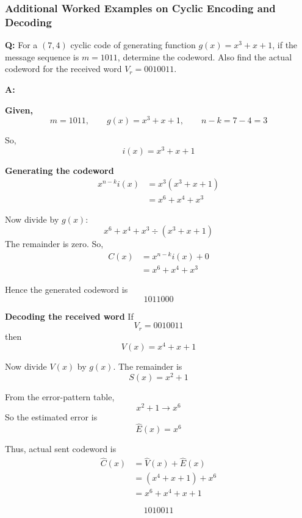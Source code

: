 \documentclass[11pt,a4paper]{book}
\newcounter{qna}[chapter]
\renewcommand{\theqna}{\thechapter.\arabic{qna}}
\newenvironment{questionanswerbox}[1][Example]{%
    \refstepcounter{qna}
    \begin{tcolorbox}[
        enhanced,
        breakable,
        colback=softlavender!10,
        colframe=softlavender!200,
        title={#1~\theqna},
        fonttitle=\bfseries,
        coltitle=white,
        colbacktitle=softlavender!200,
        sharp corners,
        boxrule=1pt,
        left=8pt,
        right=8pt,
        top=6pt,
        bottom=6pt
    ]
}{\end{tcolorbox}}
\begin{document}
\subsubsection{Additional Worked Examples on Cyclic Encoding and Decoding}

\begin{questionanswerbox}[Cyclic Encoding and Decoding Example]
\textbf{Q:} For a \((7,4)\) cyclic code of generating function \(g(x)=x^3+x+1\), if the message sequence is \(m=1011\), determine the codeword. Also find the actual codeword for the received word \(V_r=0010011\).

\textbf{A:}

\textbf{Given,}
\[
m=1011,\qquad g(x)=x^3+x+1,\qquad n-k=7-4=3
\]

So,
\[
i(x)=x^3+x+1
\]

\textbf{Generating the codeword}
\begin{align*}
x^{n-k}i(x)&=x^3(x^3+x+1)\\
          &=x^6+x^4+x^3
\end{align*}

Now divide by \(g(x)\):
\[
x^6+x^4+x^3 \div (x^3+x+1)
\]
The remainder is zero. So,
\begin{align*}
C(x)&=x^{n-k}i(x)+0\\
    &=x^6+x^4+x^3
\end{align*}

Hence the generated codeword is
\[
1011000
\]

\textbf{Decoding the received word}
If
\[
V_r=0010011
\]
then
\[
V(x)=x^4+x+1
\]

Now divide \(V(x)\) by \(g(x)\). The remainder is
\[
S(x)=x^2+1
\]

From the error-pattern table,
\[
x^2+1 \longrightarrow x^6
\]
So the estimated error is
\[
\hat E(x)=x^6
\]

Thus, actual sent codeword is
\begin{align*}
\hat C(x)&=\hat V(x)+\hat E(x)\\
         &=(x^4+x+1)+x^6\\
         &=x^6+x^4+x+1
\end{align*}

\[
1010011
\]
\end{questionanswerbox}
\end{document}
